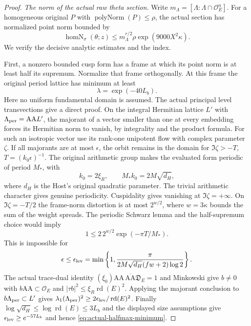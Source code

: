 \begin{proof}
\emph{The norm of the actual raw theta section.}
Write $m_\Lambda=[\Lambda:\Lambda\cap\mathcal O_E^n]$.  For a
homogeneous original $P$ with $\operatorname{polyNorm}(P)\le\rho$,
the actual section has normalized point norm bounded by
\begin{equation}\label{eq:actual-raw-theta-uniform-norm}
 \operatorname{homN}_\sigma(\theta;z)
       \le m_\Lambda^{r/2}\rho\exp(9000X^2\kappa).
\end{equation}
We verify the decisive analytic estimates and the index.

First, a nonzero bounded cusp form has a frame at which its point norm
is at least half its supremum.  Normalize that frame orthogonally.
At this frame the original period lattice has minimum at least
\begin{equation}\label{eq:actual-halfmax-minimum}
                                \lambda=\exp(-40L_b).
\end{equation}
Here no uniform fundamental domain is assumed.  The actual principal
level transvections give a direct proof.  On the integral Hermitian
lattice $L'$ with $\Lambda_{\rm per}=\mathrm{AA}L'$, the majorant
of a vector smaller than one at every embedding forces its Hermitian
norm to vanish, by integrality and the product formula.  For such an
isotropic vector use its rank-one unipotent flow with complex parameter
$\zeta$.  If all majorants are at most $\epsilon$, the orbit remains
in the domain for $\Im\zeta>-T$, $T=(k_0\epsilon)^{-1}$.
The original arithmetic group makes the evaluated form periodic of
period $M_*$, with
\[
             k_0=2\xi_R,\qquad M_*k_0=2M\sqrt{d_H},
\]
where $d_H$ is the Host's original quadratic parameter.  The trivial
arithmetic character gives genuine periodicity.  Cuspidality gives
vanishing at $\Im\zeta=+\infty$.  On $\Im\zeta=-T/2$ the
frame-norm distortion is at most $2^{w/2}$, where
$w=3\kappa$ bounds the sum of the weight spreads.  The periodic
Schwarz lemma and the half-supremum choice would imply
\[
                  1\le2\,2^{w/2}\exp(-\pi T/M_*).
\]
This is impossible for
\[
 \epsilon\le\epsilon_{\rm lev}
 =\min\left\{1,
       \frac{\pi}{2M\sqrt{d_H}(fw+2)\log2}\right\}.
\]
The actual trace-dual identity
$(\xi_0)\mathrm{AA}\,\overline{\mathrm{AA}}\mathfrak D_E=1$
and Minkowski give $b\ne0$ with $b\mathrm{AA}\subset\mathcal O_E$
and $|\tau b|^2\le\xi_R\operatorname{rd}(E)^2$.  Applying the
majorant conclusion to $b\Lambda_{\rm per}\subset L'$ gives
$\lambda_1(\Lambda_{\rm per})^2
 \ge2\epsilon_{\rm lev}/\operatorname{rd}(E)^2$.
Finally $\log\sqrt{d_H}\le\log\operatorname{rd}(E)\le3L_b$
and the displayed size assumptions give
$\epsilon_{\rm lev}\ge e^{-57L_b}$ and hence
\eqref{eq:actual-halfmax-minimum}.


\end{proof}
